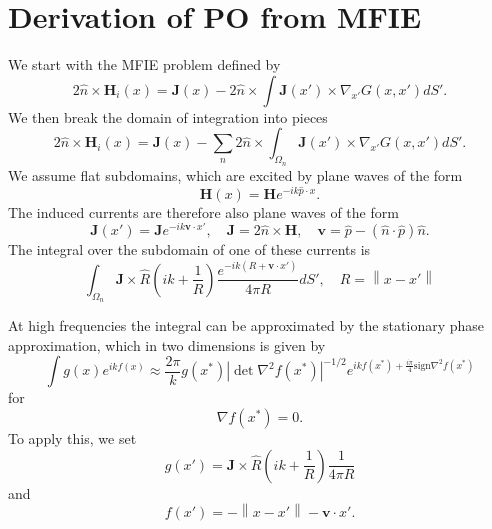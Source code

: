 \documentclass{article}
\newcommand{\norm}[1]{\left\lVert #1 \right\rVert}
\newcommand{\abs}[1]{\left\lvert #1 \right\rvert}
\theoremstyle{plain}
\begin{document}
\section{Derivation of PO from MFIE}

We start with the MFIE problem defined by
\begin{equation}
	2\hat{n}\times\mathbf{H}_i(x)
	= \mathbf{J}(x)
	- 2\hat{n}\times\int \mathbf{J}(x') \times \nabla_{x'} G(x,x') dS'.
\end{equation}
We then break the domain of integration into pieces
\begin{equation}
	2\hat{n}\times\mathbf{H}_i(x)
	= \mathbf{J}(x)
	- \sum_n 2\hat{n}\times\int_{\Omega_n} \mathbf{J}(x') \times \nabla_{x'} G(x,x') dS'.
\end{equation}
We assume flat subdomains, which are excited by plane waves of the form
\begin{equation}
	\mathbf{H}(x) = \mathbf{H}e^{-ik \hat{p} \cdot x}.
\end{equation}
The induced currents are therefore also plane waves of the form
\begin{equation}
	\mathbf{J}(x') = \mathbf{J}e^{-ik \mathbf{v} \cdot x'},
	\quad \mathbf{J} = 2\hat{n}\times\mathbf{H},
	\quad \mathbf{v} = \hat{p} - \left( \hat{n}\cdot\hat{p} \right)\hat{n}.
\end{equation}
The integral over the subdomain of one of these currents is
\begin{equation}
	\int_{\Omega_n}
	\mathbf{J} \times \hat{R}
	\left( ik + \frac{1}{R} \right)
	\frac{e^{-ik\left(R + \mathbf{v} \cdot x'\right)}}{4\pi R} dS',
	\quad R = \norm{x-x'}
\end{equation}



At high frequencies the integral can be approximated by the stationary phase approximation,
which in two dimensions is given by
\begin{equation}
	\int g(x) e^{ikf(x)}
	\approx \frac{2\pi}{k} g(x^*)
	\abs{\det \nabla^2 f(x^*)}^{-1/2}
	e^{ikf(x^*) + \frac{i\pi}{4}\text{sign}\nabla^2 f(x^*)}
\end{equation}
for
\begin{equation}
	\nabla f(x^*) = 0.
\end{equation}
To apply this, we set
\begin{equation}
	g(x') = 
	\mathbf{J} \times \hat{R}
	\left( ik + \frac{1}{R} \right)
	\frac{1}{4\pi R}
\end{equation}
and
\begin{equation}
	f(x') = -\norm{x-x'} - \mathbf{v}\cdot x'.
\end{equation}
\end{document}
